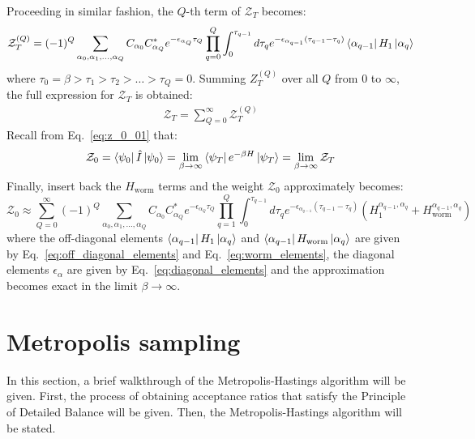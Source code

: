 \documentclass[12pt, two sided]{article}
\begin{document}
Proceeding in similar fashion, the $Q$-th term of $\mathcal{Z}_T$ becomes:
\begin{equation}
\label{eq:Z^q}
\mathcal{Z}_T^{(Q)} = (-1)^{Q}  \sum_{\alpha_0,\alpha_1,\dots,\alpha_Q} C_{\alpha_0} C_{\alpha_Q}^* e^{-\epsilon_{\alpha_Q} \tau_Q} \prod_{q=0}^Q \int_0^{\tau_{q-1}} d\tau_q e^{-\epsilon_{\alpha_{q-1}}(\tau_{q-1}-\tau_q)} 
\bra{\alpha_{q-1}} H_1 \ket{\alpha_q}
\end{equation}
where $\tau_0 = \beta > \tau_1 > \tau_2 > \dots > \tau_Q = 0$. Summing $Z_T^{(Q)}$ over all $Q$ from $0$ to $\infty$, the full expression for $\mathcal{Z}_T$ is obtained:
%
\begin{equation}
\begin{aligned}
\mathcal{Z}_T = \sum_{Q=0}^{\infty} \mathcal{Z}_T^{(Q)}
\end{aligned}
\end{equation}
%
Recall from Eq.~\eqref{eq:z_0_01} that:
%
\begin{equation}
\mathcal{Z}_0 = \bra{\psi_0} \hat{I} \ket{\psi_0} = \lim_{\beta\to\infty} \bra{\psi_T} e^{-\beta H} \ket{\psi_T} = \lim_{\beta\to\infty} \mathcal{Z}_T
\end{equation}
%
Finally, insert back the $H_\mathrm{worm}$ terms and the weight $\mathcal{Z}_0$ approximately becomes:
\begin{equation}
\label{eq:Z_0}
\mathcal{Z}_0 \approx 
\sum_{Q=0}^{\infty} (-1)^{Q}  \sum_{\alpha_0,\alpha_1,\dots,\alpha_Q} C_{\alpha_0} C_{\alpha_Q}^* e^{-\epsilon_{\alpha_Q} \tau_Q} \prod_{q=1}^Q \int_0^{\tau_{q-1}} d\tau_q e^{-\epsilon_{\alpha_{q-1}}(\tau_{q-1}-\tau_q)} 
(H_1^{\alpha_{q-1},\alpha_q} + H_\mathrm{worm}^{\alpha_{q-1},\alpha_q})
\end{equation}
where the off-diagonal elements $\bra{\alpha_{q-1}} H_1 \ket{\alpha_q}$ and $\bra{\alpha_{q-1}} H_\mathrm{worm} \ket{\alpha_q}$ are given by Eq.~\eqref{eq:off_diagonal_elements} and Eq.~\eqref{eq:worm_elements}, the diagonal elements $\epsilon_{\alpha}$ are given by Eq.~\eqref{eq:diagonal_elements} and the approximation becomes exact in the limit $\beta\to\infty$.

\section{Metropolis sampling}

In this section, a brief walkthrough of the Metropolis-Hastings algorithm \cite{doi:10.1063/1.1699114} will be given. First, the process of obtaining acceptance ratios that satisfy the Principle of Detailed Balance will be given. Then, the Metropolis-Hastings algorithm will be stated.
\end{document}
